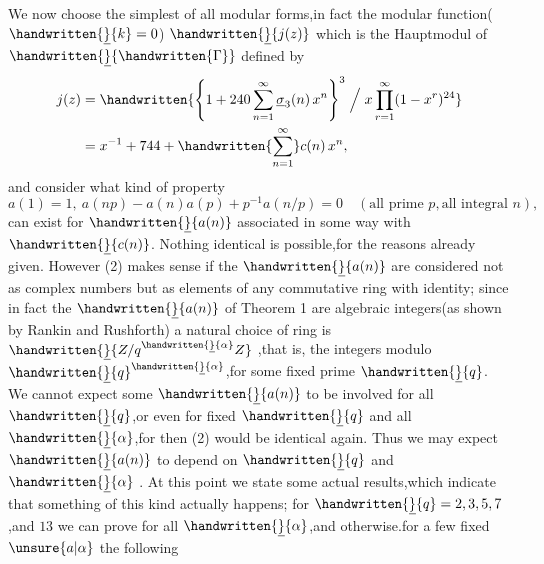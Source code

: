 We now choose the simplest of all modular forms,in fact the modular function($\handwritten{\underline}{k}=0$) $\handwritten{\underline}{j(z)}$ which is the Hauptmodul of $\handwritten{\underline}{\handwritten{\Gamma}}$ defined by
\[
\begin{aligned}
j(z)&=\handwritten{\left\{1+240\sum_{n=1}^{\infty}\underline{\sigma}_{3}(n)\,x^n\right\}^{3}\Bigm/ x\prod_{r=1}^{\infty}(1-x^{r})^{24}}\\
&=x^{-1}+744+\handwritten{\sum_{n=1}^{\infty}}c(n)\,x^n,
\end{aligned}
\]
\reversemarginpar{}\normalmarginpar
and consider what kind of property
\[
a(1)=1,\ a(np)-a(n)a(p)+p^{-1}a(n/p)=0\quad (\text{all prime }p,\text{all integral }n),
\tag*{(2)}
\]
can exist for $\handwritten{\underline}{a(n)}$ associated in some way with $\handwritten{\underline}{c(n)}$. Nothing identical is possible,for the reasons already given. However (2) makes sense if the $\handwritten{\underline}{a(n)}$ are considered not as complex numbers but as elements of any commutative ring with identity; since in fact the $\handwritten{\underline}{a(n)}$ of Theorem 1 are algebraic integers(as shown by Rankin and Rushforth) a natural choice of ring is $\handwritten{\underline}{Z/q^{\handwritten{\underline}{\alpha}}Z}$ ,that is, the integers modulo $\handwritten{\underline}{q}^{\handwritten{\underline}{\alpha}}$,for some fixed prime $\handwritten{\underline}{q}$. We cannot expect some  $\handwritten{\underline}{a(n)}$ to be involved for all $\handwritten{\underline}{q}$,or even for fixed $\handwritten{\underline}{q}$ and all $\handwritten{\underline}{\alpha}$,for then (2) would be identical again. Thus we may expect $\handwritten{\underline}{a(n)}$ to depend on $\handwritten{\underline}{q}$ and $\handwritten{\underline}{\alpha}$ . At this point we  state some actual results,which indicate that something of this kind actually happens; for $\handwritten{\underline}{q}=2,3,5,7$,and $13$ we can prove for all $\handwritten{\underline}{\alpha}$,and otherwise.for a few fixed $\unsure{a|\alpha}$ the following

